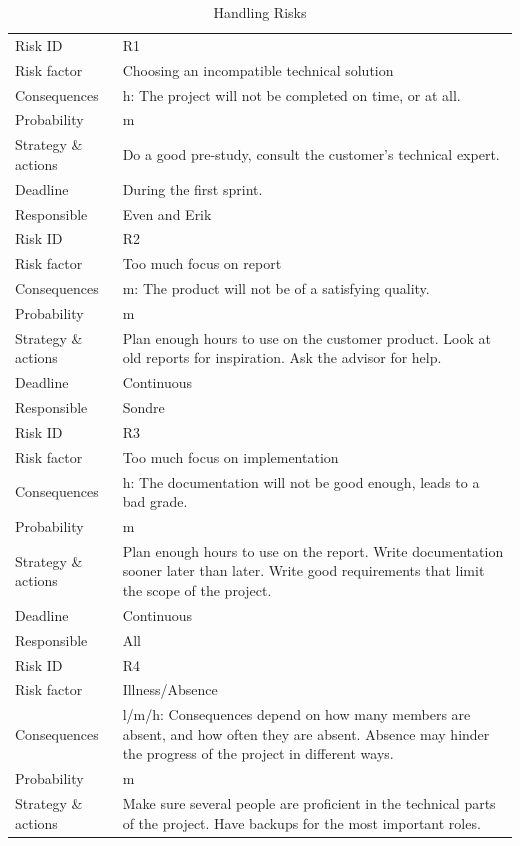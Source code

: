 \begin{longtable}{l p{9cm}}
	\caption{Handling Risks}
	\endhead
	\toprule
	Risk ID & R1 \\
	Risk factor & Choosing an incompatible technical solution \\
	Consequences & \Gls{h}: The project will not be completed on time, or at all. \\
	Probability & \Gls{m} \\ 
	Strategy \& actions & Do a good pre-study, consult the customer’s technical expert. \\
	Deadline & During the first sprint.\\
	Responsible & Even and Erik \\
	\midrule
	Risk ID & R2 \\
	Risk factor & Too much focus on report \\
	Consequences & \Gls{m}: The product will not be of a satisfying quality. \\
	Probability & \Gls{m} \\ 
	Strategy \& actions & Plan enough hours to use on the customer product. Look at old reports for inspiration. Ask the advisor for help. \\
	Deadline & Continuous\\
	Responsible & Sondre \\
	\midrule
	Risk ID & R3 \\
	Risk factor & Too much focus on implementation \\
	Consequences & \Gls{h}: The documentation will not be good enough, leads to a bad grade. \\
	Probability & \Gls{m} \\ 
	Strategy \& actions & Plan enough hours to use on the report. Write documentation sooner later than later. Write good requirements that limit the scope of the project. \\
	Deadline & Continuous \\
	Responsible & All \\
	\midrule
	Risk ID & R4 \\
	Risk factor & Illness/Absence \\
	Consequences & \Gls{l}/\Gls{m}/\Gls{h}: Consequences depend on how many members are absent, and how often they are absent. Absence may hinder the progress of the project in different ways.  \\
	Probability & \Gls{m} \\ 
	Strategy \& actions & Make sure several people are proficient in the technical parts of the project. Have backups for the most important roles. \\

\end{longtable}
